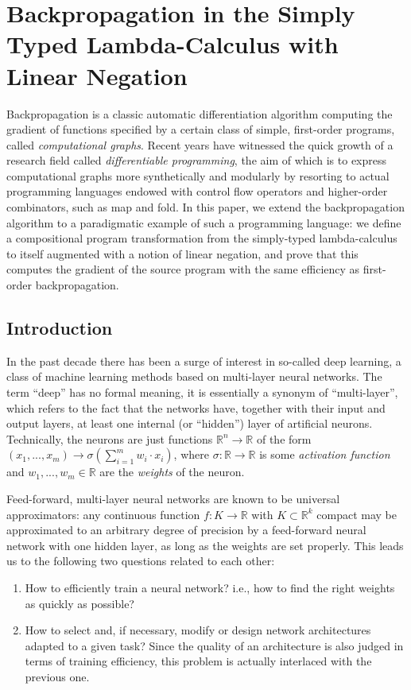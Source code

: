 \section{Backpropagation in the Simply Typed Lambda-Calculus with Linear Negation}
Backpropagation is a classic automatic diﬀerentiation algorithm computing the gradient of functions speciﬁed by a certain class of simple, ﬁrst-order programs, called \emph{computational graphs}. 
Recent years have witnessed the quick growth of a research ﬁeld called \emph{diﬀerentiable programming}, the aim of which is to express computational graphs more synthetically and modularly by resorting to actual programming languages endowed with control ﬂow operators and higher-order combinators, such as map and fold. In this paper, we extend the backpropagation algorithm to a paradigmatic example of such a programming language: we deﬁne a compositional program transformation from the simply-typed lambda-calculus to itself augmented with a notion of linear negation, and prove that this computes the gradient of the source program with the same eﬃciency as ﬁrst-order backpropagation.

\subsection{Introduction}
In the past decade there has been a surge of interest in so-called deep learning, a class of machine learning methods based on multi-layer neural networks. The term “deep” has no formal meaning, it is essentially a synonym of “multi-layer”, which refers to the fact that the networks have, together with their input and output layers, at least one internal (or “hidden”) layer of artiﬁcial neurons. Technically, the neurons are just functions $\mathbb{R}^n \rightarrow \mathbb{R}$ of the form $(x_1,..., x_m) \rightarrow \sigma(\sum^{m}_{i=1} w_i \cdot x_i)$, where $\sigma: \mathbb{R}\rightarrow\mathbb{R}$ is some \emph{activation function} and $w_1,..., w_m \in \mathbb{R}$ are the \emph{weights} of the neuron.

Feed-forward, multi-layer neural networks are known to be universal approximators: any continuous function $f: K \rightarrow \mathbb{R}$ with $K \subset \mathbb{R}^k$ compact may be approximated to an arbitrary degree of precision by a feed-forward neural network with one hidden layer, as long as the weights are set properly. This leads us to the following two questions related to each other:
\begin{enumerate}
	\item How to eﬃciently train a neural network? i.e., how to ﬁnd the right weights as quickly as possible?
	\item How to select and, if necessary, modify or design network architectures adapted to a given task?
	Since the quality of an architecture is also judged in terms of training eﬃciency, this problem is actually interlaced
	with the previous one.
\end{enumerate}

